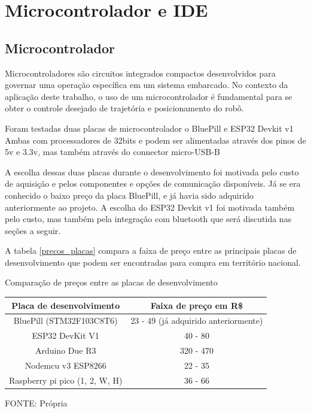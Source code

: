 
\section{Microcontrolador e IDE}

\subsection{Microcontrolador}

Microcontroladores são circuitos integrados compactos desenvolvidos para governar
uma operação específica em um sistema embarcado. No contexto da aplicação deste
trabalho, o uso de um microcontrolador é fundamental para se obter o controle
desejado de trajetória e posicionamento do robô.

Foram testadas duas placas de microcontrolador o BluePill e ESP32 Devkit v1
Ambas com processadores de 32bits
e podem ser alimentadas através dos pinos de 5v e 3.3v, mas também através do connector micro-USB-B

A escolha dessas duas placas durante o desenvolvimento foi motivada pelo custo de aquisição
e pelos componentes e opções de comunicação disponíveis.
Já se era conhecido o baixo preço da placa BluePill, e já havia sido adquirido anteriormente ao projeto.
A escolha do ESP32 Devkit v1 foi motivada também pelo custo, mas também pela
integração com bluetooth que será discutida nas seções a seguir.

A tabela \ref{precos_placas} compara a faixa de preço entre as principais placas de desenvolvimento
que podem ser encontradas para compra em território nacional.

\begin{quadro}[htb]
	\caption{Comparação de preços entre as placas de desenvolvimento \label{precos_placas}}
	 \begin{tabular}{|c|c|}
		\hline
		\textbf{Placa de desenvolvimento} & \textbf{Faixa de preço em R\$} \\ \hline
		BluePill (STM32F103C8T6) &  23 - 49 (já adquirido anteriormente) \\ \hline
		ESP32 DevKit V1  &  40 - 80   \\ \hline
		Arduino Due R3 &  320 - 470   \\ \hline
		Nodemcu v3 ESP8266 & 22 - 35   \\ \hline
		Raspberry pi pico (1, 2, W, H)  & 36 - 66  \\ \hline
	\end{tabular}
	\caption*{FONTE: Própria}
\end{quadro}

